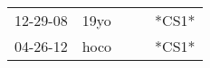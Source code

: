 \begin{supertabular}{p{0.07\textwidth}p{0.06\textwidth}p{0.02\textwidth}p{0.02\textwidth}p{0.06\textwidth}}
 12-29-08\textsuperscript{} &  19yo\textsuperscript{} &   &   &  *CS1* \\
 04-26-12\textsuperscript{} &  hoco\textsuperscript{} &   &   &  *CS1* \\
\end{supertabular}
